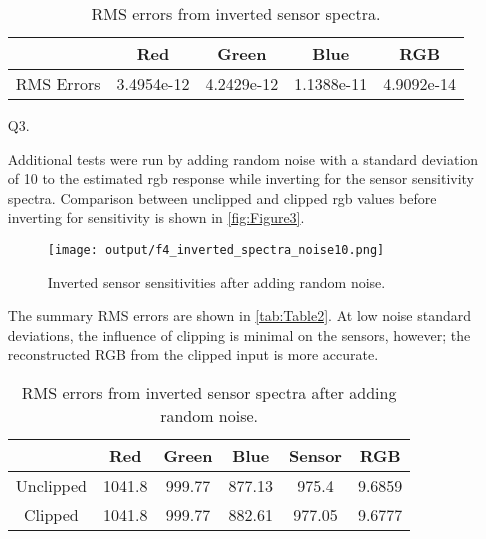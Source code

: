 \documentclass[12pt]{report}
\begin{document}
\begin{enumerate}
    \begin{table}[h!]
    \begin{center}
    \begin{tabular}{ c | c | c | c | c} 
        \hline
        & Red & Green & Blue & RGB \\ 
        \hline \hline
        RMS Errors & 3.4954e-12 & 4.2429e-12 & 1.1388e-11 & 4.9092e-14 \\ 
        \hline
    \end{tabular}
    \caption{RMS errors from inverted sensor spectra.}
    \label{tab:Table1}
    \end{center}
    \end{table}

    \item[Q3.]

    Additional tests were run by adding random noise with a standard deviation of 10 to the estimated rgb response while inverting 
    for the sensor sensitivity spectra. Comparison between unclipped and clipped rgb values before inverting for sensitivity is 
    shown in \autoref{fig:Figure3}.

    \begin{figure}[ht!]
        \centering
        \texttt{[image: output/f4\_inverted\_spectra\_noise10.png]}
        \caption{Inverted sensor sensitivities after adding random noise.}
        \label{fig:Figure3}
    \end{figure}

    \FloatBarrier

    The summary RMS errors are shown in \autoref{tab:Table2}. At low noise standard deviations, the influence of clipping is 
    minimal on the sensors, however; the reconstructed RGB from the clipped input is more accurate.

    \begin{table}[h!]
    \begin{center}
    \begin{tabular}{ c | c | c | c | c | c} 
        \hline
        & Red & Green & Blue & Sensor & RGB \\ 
        \hline \hline
        Unclipped & 1041.8 & 999.77 & 877.13 & 975.4 & 9.6859 \\ 
        Clipped & 1041.8 & 999.77 & 882.61 & 977.05 & 9.6777  \\
        \hline
    \end{tabular}
    \caption{RMS errors from inverted sensor spectra after adding random noise.}
    \label{tab:Table2}
    \end{center}
    \end{table}


\end{enumerate}
\end{document}
